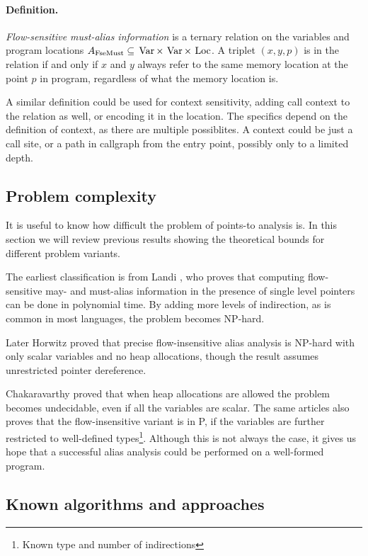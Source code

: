 \paragraph{Definition.} {\it Flow-sensitive must-alias information} is a ternary
relation on the variables and program locations $A_{\mathrm{FseMust}} \subseteq
\operatorname*{\,Var} \times \operatorname*{\,Var} \times \operatorname*{\,Loc}$. A triplet $(x,y,p)$ is in the relation if and only if $x$
and $y$ always refer to the same memory location at the point $p$ in program,
regardless of what the memory location is.

A similar definition could be used for context sensitivity, adding call context
to the relation as well, or encoding it in the location. The specifics depend on
the definition of context, as there are multiple possiblites. A context could be
just a call site, or a path in callgraph from the entry point, possibly only to
a limited depth.

\subsection{Problem complexity}

It is useful to know how difficult the problem of points-to analysis is. In this
section we will review previous results showing the theoretical bounds for
different problem variants.

The earliest classification is from Landi \cite{Landi1991}, who proves that
computing flow-sensitive may- and must-alias information in the presence of
single level pointers can be done in polynomial time. By adding more levels of
indirection, as is common in most languages, the problem becomes NP-hard.

Later Horwitz \cite{Horwitz1997}  proved that precise flow-insensitive alias
analysis is NP-hard with only scalar variables and no heap allocations, though
the result assumes unrestricted pointer dereference.

Chakaravarthy \cite{ptcomp} proved that when heap allocations are allowed the
problem becomes undecidable, even if all the variables are scalar. The same
articles also proves that the flow-insensitive variant is in P, if the
variables are further restricted to well-defined types\footnote{Known type and
number of indirections}. Although this is not always the case, it gives us hope
that a successful alias analysis could be performed on a well-formed program.



\subsection{Known algorithms and approaches}

